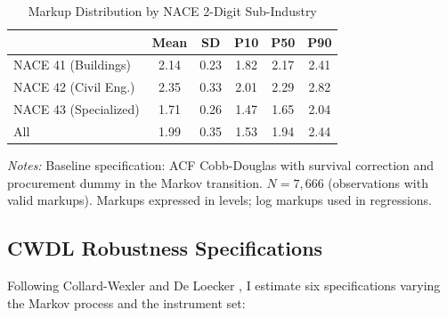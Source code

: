 \documentclass[11pt]{article}
\begin{document}
\begin{table}[htbp]\centering
\caption{Markup Distribution by NACE 2-Digit Sub-Industry}\label{tab:markup_nace}
\begin{threeparttable}
\begin{tabular}{lccccc}
\toprule
 & Mean & SD & P10 & P50 & P90 \\
\midrule
NACE 41 (Buildings) & 2.14 & 0.23 & 1.82 & 2.17 & 2.41 \\
NACE 42 (Civil Eng.) & 2.35 & 0.33 & 2.01 & 2.29 & 2.82 \\
NACE 43 (Specialized) & 1.71 & 0.26 & 1.47 & 1.65 & 2.04 \\
\midrule
All & 1.99 & 0.35 & 1.53 & 1.94 & 2.44 \\
\bottomrule
\end{tabular}
\begin{tablenotes}\footnotesize
\item \emph{Notes:} Baseline specification: ACF Cobb-Douglas with survival correction and procurement dummy in the Markov transition. $N = 7{,}666$ (observations with valid markups). Markups expressed in levels; log markups used in regressions.
\end{tablenotes}
\end{threeparttable}
\end{table}

\subsection{CWDL Robustness Specifications}\label{app:cwdl}

Following Collard-Wexler and De Loecker \cite{CWDL2015}, I estimate six specifications varying the Markov process and the instrument set:
\end{document}
